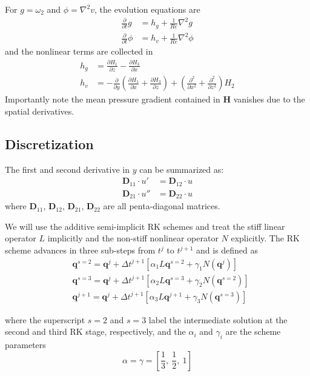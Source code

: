 \documentclass[titlepage,12pt,letter]{article}
\newcommand{\bracket}[1]{\left[ #1 \right]}
\newcommand{\re}{Re}
\numberwithin{equation}{section}
\begin{document}
For $g = \omega_2$ and $\phi = \nabla^2 v$, the evolution equations are
\begin{align}
	\frac{\partial}{\partial t} g &=h_{g}+\frac{1}{\re} \nabla^{2} g \label{eq:vor}\\
	\frac{\partial}{\partial t} \phi &=h_{v}+\frac{1}{\re} \nabla^{2} \phi \label{eq:phi}
\end{align}
and the nonlinear terms are collected in
\begin{align}
	h_{g} &=\frac{\partial H_{1}}{\partial z}-\frac{\partial H_{3}}{\partial x} \\
	h_{v} &=-\frac{\partial}{\partial y}\left(\frac{\partial H_{1}}{\partial x}+\frac{\partial H_{3}}{\partial z}\right)+\left(\frac{\partial^{2}}{\partial x^{2}}+\frac{\partial^{2}}{\partial z^{2}}\right) H_{2}
\end{align}
Importantly note the mean pressure gradient contained in $\bm{H}$ vanishes due to the spatial derivatives.

\subsection{Discretization}
The first and second derivative in $y$ can be summarized as:
\begin{align}
	\bm{D}_{11} \cdot u' &= \bm{D}_{12} \cdot u \label{eq:fd1}\\
	\bm{D}_{21} \cdot u'' &= \bm{D}_{22} \cdot u \label{eq:fd2}
\end{align}
where $\bm{D}_{11}$, $\bm{D}_{12}$, $\bm{D}_{21}$, $\bm{D}_{22}$ are all penta-diagonal matrices.

We will use the additive semi-implicit RK schemes and treat the stiff linear operator $L$ implicitly and the non-stiff nonlinear operator $N$ explicitly. The RK scheme advances in three sub-steps from $t^{j}$ to $t^{j+1}$ and is defined as
\begin{align*}
	&\bm{q}^{s=2}=\bm{q}^{j}+\Delta t^{j+1}\left[\alpha_{1} L \bm{q}^{s=2}+\gamma_{1} N\left(\bm{q}^{j}\right)\right] \\
	&\bm{q}^{s=3}=\bm{q}^{j}+\Delta t^{j+1}\left[\alpha_{2} L \bm{q}^{s=3}+\gamma_{2} N\left(\bm{q}^{s=2}\right)\right] \\
	&\bm{q}^{j+1}=\bm{q}^{j}+\Delta t^{j+1}\left[\alpha_{3} L \bm{q}^{j+1}+\gamma_{3} N\left(\bm{q}^{s=3}\right)\right]
\end{align*}

where the superscript $s=2$ and $s=3$ label the intermediate solution at the second and third RK stage, respectively, and the $\alpha_{i}$ and $\gamma_{i}$ are the scheme parameters 
\begin{equation}
	\alpha = \gamma=\bracket{\frac{1}{3}, \ \frac{1}{2}, \ 1}
\end{equation}
\end{document}
